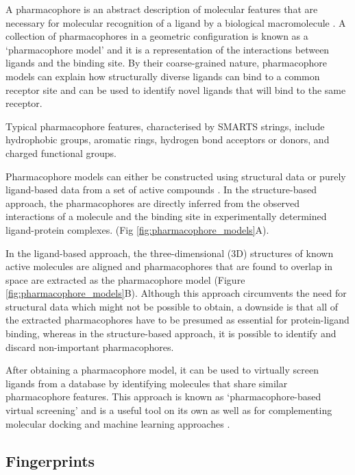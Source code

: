 A pharmacophore is an abstract description of molecular features that are necessary for molecular recognition of a ligand by a biological macromolecule \cite{Kaserer2015PharmacophoreReview}. A collection of pharmacophores in a geometric configuration is known as a `pharmacophore model' and it is a representation of the interactions between ligands and the binding site. By their coarse-grained nature, pharmacophore models can explain how structurally diverse ligands can bind to a common receptor site and can be used to identify novel ligands that will bind to the same receptor.

Typical pharmacophore features, characterised by SMARTS strings, include hydrophobic groups, aromatic rings, hydrogen bond acceptors or donors, and charged functional groups.

Pharmacophore models can either be constructed using structural data or purely ligand-based data from a set of active compounds \cite{Vuorinen2015pharmacophore}. In the structure-based approach, the pharmacophores are directly inferred from the observed interactions of a molecule and the binding site in experimentally determined ligand-protein complexes. (Fig \ref{fig:pharmacophore_models}A).

In the ligand-based approach, the three-dimensional (3D) structures of known active molecules are aligned and pharmacophores that are found to overlap in space are extracted as the pharmacophore model (Figure \ref{fig:pharmacophore_models}B). Although this approach circumvents the need for structural data which might not be possible to obtain, a downside is that all of the extracted pharmacophores have to be presumed as essential for protein-ligand binding, whereas in the structure-based approach, it is possible to identify and discard non-important pharmacophores.

After obtaining a pharmacophore model, it can be used to virtually screen ligands from a database by identifying molecules that share similar pharmacophore features. This approach is known as `pharmacophore-based virtual screening' and is a useful tool on its own as well as for complementing molecular docking and machine learning approaches \cite{Dixon2006pharmacophore, Temml2014pharmacophore, Pradeepkiran2019pharmacophore, Pal2019pharmacophore}.


\subsection{Fingerprints} \label{subsec:fingerprints}

